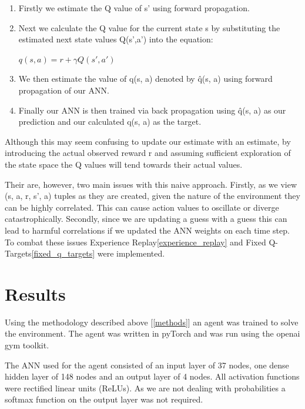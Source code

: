 \documentclass[12pt]{article}
\begin{document}
\begin{enumerate}
	\item Firstly we estimate the Q value of s' using forward propagation.
	\item Next we calculate the Q value for the current state s by substituting the estimated next state values Q(s',a') 
			into the equation:
	\begin{center}
		$q(s,a) = r+\gamma Q(s',a') $
	\end{center}
	\item We then estimate the value of q(s, a) denoted by \^q(s, a) using forward propagation of our ANN.
	\item Finally our ANN is then trained via back propagation using  \^q(s, a) as our prediction and our calculated q(s, a) as the target.
\end{enumerate}

Although this may seem confusing to update our estimate with an estimate, by introducing the actual observed reward r 
and assuming sufficient exploration of the state space the Q values will tend towards their actual values.

Their are, however, two main issues with this naive approach. 
Firstly, as we view (s, a, r, s', a) tuples as they are created, 
given the nature of the environment they can be highly correlated.
This can cause action values to oscillate or diverge catastrophically.
Secondly, since we are updating a guess with a guess this can lead to harmful correlations if we updated the ANN weights on each time step.
To combat these issues Experience Replay\ref{experience_replay} and Fixed Q-Targets\ref{fixed_q_targets} were implemented.

\section{Results}

Using the methodology described above [\ref{methods}] an agent was trained to solve the environment.
The agent was written in pyTorch and was run using the openai gym toolkit.

The ANN used for the agent consisted of an input layer of 37 nodes, one dense hidden layer of 148 nodes and an output layer of 4 nodes.
All activation functions were rectified linear units (ReLUs). 
As we are not dealing with probabilities a softmax function on the output layer was not required.
\end{document}
